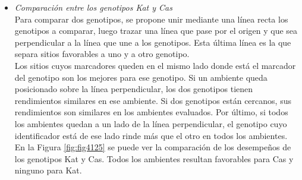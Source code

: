 \begin{itemize}[wide, nosep, labelindent = 0pt, topsep = 1ex, noitemsep,topsep=0pt]

\item \emph{Comparación entre los genotipos Kat y Cas}\\

Para comparar dos genotipos, se propone unir mediante una línea recta los genotipos a comparar, luego trazar una línea que pase por el origen y que sea perpendicular a la línea que une a los genotipos. Esta última línea es la que separa sitios favorables a uno y a otro genotipo.\\
Los sitios cuyos marcadores queden en el mismo lado donde está el marcador del genotipo son los mejores para ese genotipo. Si un ambiente queda posicionado sobre la línea perpendicular, los dos genotipos tienen rendimientos similares en ese ambiente. Si dos genotipos están cercanos, sus rendimientos son similares en los ambientes evaluados. Por último, si todos los ambientes quedan a un lado de la línea perpendicular, el genotipo cuyo identificador está de ese lado rinde más que el otro en todos los ambientes.\\
En la Figura \ref{fig:fig4125} se puede ver la comparación de los desempeños de los genotipos Kat y Cas. Todos los ambientes resultan favorables para Cas y ninguno para Kat.\\



\end{itemize}
